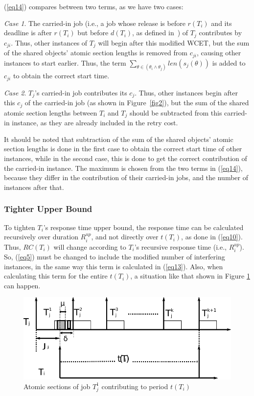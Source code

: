 \documentclass{sig-alternate}
\begin{document}
(\ref{eq14}) compares between two terms, as we have two cases:


\textit{Case 1}. The carried-in job (i.e., a job whose release is before $r(T_i)$ and its deadline is after $r(T_i)$ but before $d(T_i)$, as defined in~\cite{key-2}) of $T_j$
contributes by $c_{ji}$. Thus, other instances of $T_j$ will begin after this modified WCET, but the sum of the shared objects' atomic section lengths is removed from $c_{ji}$, causing other instances to start earlier. Thus, the term $\sum_{\theta\in(\theta_i\wedge\theta_j)} {len(s_{j}(\theta))}$ is added to $c_{ji}$ to obtain the correct start time. 

\textit{Case 2}. $T_j$'s carried-in job contributes its $c_j$. Thus, other instances begin after this $c_j$ of the carried-in job (as shown in Figure~\ref{fig2}), but the sum of the shared atomic section lengths  between $T_i$ and $T_j$ should be subtracted from this carried-in
instance, as they are already included in the retry cost. 

It should be noted that subtraction of the sum of the shared objects' atomic section lengths is done in the first case to obtain the correct start time of other instances, while in the second case, this is done to get the correct contribution of the carried-in  instance. The maximum is chosen from the two terms in (\ref{eq14}), because they differ in the contribution of their carried-in jobs, and the number of instances after that.

\subsubsection{Tighter Upper Bound}

To tighten $T_{i}$'s response time upper bound, the response time can be calculated recursively over duration $R_i^{up}$, 
and not directly over $t(T_i)$, as done in (\ref{eq10}). Thus, $RC(T_{i})$ will change according
to $T_i$'s recursive response time (i.e., $R_{i}^{up}$). So, (\ref{eq5}) must be changed to include the modified number of interfering instances, in the same way this term  
is calculated in (\ref{eq13}). Also, when calculating this term 
for the entire $t(T_{i})$, a situation like that shown in Figure
\ref{fig10} can happen.
\begin{figure}
\centering{}\includegraphics[scale=0.5]{figures/figure10}\caption{\label{fig10} Atomic sections of job $T_{j}^{1}$ contributing to period $t(T_i)$}
\end{figure}
\end{document}
